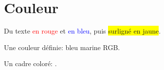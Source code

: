 \documentclass{article}
\begin{document}
\hsize=380pt
\section{Couleur}
Du texte \textcolor{red}{en rouge} et \textcolor{blue}{en bleu},
puis \colorbox{yellow}{surlign\'e en jaune}.

Une couleur d\'efinie: \textcolor{marine}{bleu marine RGB}.

Un cadre color\'e: .
\end{document}
